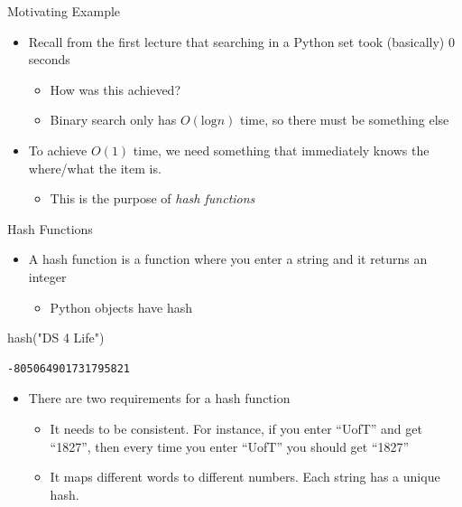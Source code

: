 \documentclass[
  ignorenonframetext,
]{beamer}
\newenvironment{Shaded}{\begin{snugshade}}{\end{snugshade}}
\newcommand{\BuiltInTok}[1]{\textcolor[rgb]{0.00,0.23,0.31}{#1}}
\newcommand{\NormalTok}[1]{\textcolor[rgb]{0.00,0.23,0.31}{#1}}
\newcommand{\StringTok}[1]{\textcolor[rgb]{0.13,0.47,0.30}{#1}}
\providecommand{\tightlist}{%
  \setlength{\itemsep}{0pt}\setlength{\parskip}{0pt}}\usepackage{longtable,booktabs,array}
\begin{document}
\begin{frame}{Motivating Example}
\protect\hypertarget{motivating-example-1}{}
\begin{itemize}
\item
  Recall from the first lecture that searching in a Python set took
  (basically) 0 seconds

  \begin{itemize}
  \item
    How was this achieved?
  \item
    Binary search only has \(O(\text{log}n)\) time, so there must be
    something else
  \end{itemize}
\item
  To achieve \(O(1)\) time, we need something that immediately knows the
  where/what the item is.

  \begin{itemize}
  \tightlist
  \item
    This is the purpose of \emph{hash functions}
  \end{itemize}
\end{itemize}
\end{frame}

\begin{frame}[fragile]{Hash Functions}
\protect\hypertarget{hash-functions}{}
\begin{itemize}
\item
  A hash function is a function where you enter a string and it returns
  an integer

  \begin{itemize}
  \tightlist
  \item
    Python objects have hash
  \end{itemize}
\end{itemize}

\begin{Shaded}
\begin{Highlighting}[]
\BuiltInTok{hash}\NormalTok{(}\StringTok{"DS 4 Life"}\NormalTok{)}
\end{Highlighting}
\end{Shaded}

\begin{verbatim}
-805064901731795821
\end{verbatim}

\begin{itemize}
\item
  There are two requirements for a hash function

  \begin{itemize}
  \item
    It needs to be consistent. For instance, if you enter ``UofT'' and
    get ``1827'', then every time you enter ``UofT'' you should get
    ``1827''
  \item
    It maps different words to different numbers. Each string has a
    unique hash.
  \end{itemize}
\end{itemize}
\end{frame}
\end{document}
